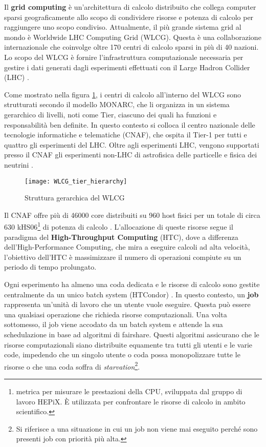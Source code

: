 Il \textbf{grid computing} è un'architettura di calcolo distribuito che
collega computer sparsi geograficamente allo scopo di condividere risorse e
potenza di calcolo per raggiungere uno scopo condiviso.
Attualmente, il più grande sistema grid al mondo è Worldwide LHC Computing
Grid (WLCG). Questa è una collaborazione internazionale che coinvolge oltre
170 centri di calcolo sparsi in più di 40 nazioni. Lo scopo del WLCG è fornire
l'infrastruttura computazionale necessaria per gestire i dati generati dagli
esperimenti effettuati con il Large Hadron Collider (LHC) \cite{WLCG2023}.

Come mostrato nella figura \ref{fig:WLCG_tier_hierarchy}, i centri di calcolo
all'interno del WLCG sono strutturati secondo il modello MONARC, che li
organizza in un sistema gerarchico di livelli, noti come Tier, ciascuno dei
quali ha funzioni e responsabilità ben definite.
In questo contesto si colloca il centro nazionale delle tecnologie
informatiche e telematiche (CNAF), che ospita il Tier-1 per tutti e quattro
gli esperimenti del LHC. Oltre agli esperimenti LHC, vengono supportati presso
il CNAF gli esperimenti non-LHC di astrofisica delle particelle e fisica dei
neutrini \cite{Bortolotti2012}.

\begin{figure}[ht]
    \centering
    \texttt{[image: WLCG\_tier\_hierarchy]}
    \caption{Struttura gerarchica del WLCG \protect\cite{dalpra2019}}
    \label{fig:WLCG_tier_hierarchy}
\end{figure}

Il CNAF offre più di 46000 core distribuiti su 960 host fisici per un totale di
circa $630$ kHS06\footnote{metrica per misurare le prestazioni della CPU,
sviluppata dal gruppo di lavoro HEPiX. È utilizzata per confrontare le risorse
di calcolo in ambito scientifico.} di potenza di calcolo \cite{hepix2022}.
L'allocazione di queste risorse segue il paradigma del \textbf{High-Throughput
Computing} (HTC), dove a differenza dell'High-Performance Computing, che mira
a eseguire calcoli ad alta velocità, l'obiettivo dell'HTC è massimizzare il
numero di operazioni compiute su un periodo di tempo prolungato. 

Ogni esperimento ha almeno una coda dedicata e le risorse di calcolo sono
gestite centralmente da un unico batch system (HTCondor) \cite{cnaf_calcolo}.
In questo contesto, un \textbf{job} rappresenta un'unità di lavoro che un
utente vuole eseguire. Questa può essere una qualsiasi operazione che richieda
risorse computazionali. Una volta sottomesso, il job viene accodato da un
batch system e attende la sua schedulazione in base ad algoritmi di fairshare.
Questi algoritmi assicurano che le risorse computazionali siano distribuite
equamente tra tutti gli utenti e le varie code, impedendo che un singolo
utente o coda possa monopolizzare tutte le risorse o che una coda soffra di
\textit{starvation}\footnote{Si riferisce a una situazione in cui un job non
viene mai eseguito perché sono presenti job con priorità più alta.}.


